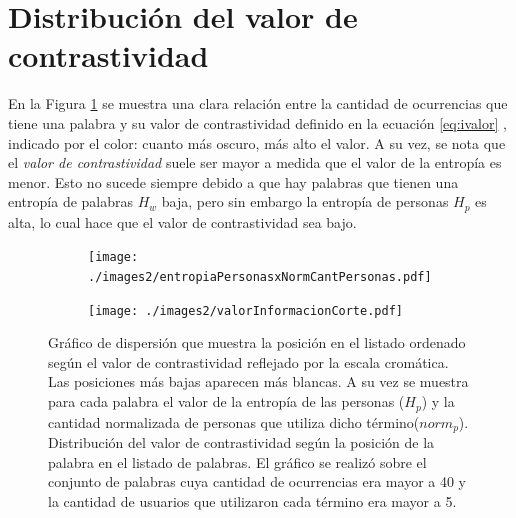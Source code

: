 \section{Distribución del valor de contrastividad}
\label{sec:ValorDeLaInformacion}
En la Figura \ref{fig:infoValue} se muestra una clara relación entre la cantidad de ocurrencias que tiene una palabra y su valor de contrastividad definido en la ecuación \ref{eq:ivalor} , indicado por el color: cuanto más oscuro, más alto el valor. A su vez, se nota que el \textit{valor de contrastividad} suele ser mayor a medida que el valor de la entropía es menor. Esto no sucede siempre debido a que hay palabras que tienen una entropía de palabras $H_w$ baja, pero sin embargo la entropía de personas $H_p$ es alta, lo cual hace que el valor de contrastividad sea bajo.



\begin{figure}[!ht]\centering
  \begin{subfigure}[t]{0.49\linewidth}
    \centering
\texttt{[image: ./images2/entropiaPersonasxNormCantPersonas.pdf]}
\caption{} 
\label{fig:infoValue} 
  
   \end{subfigure}
   \begin{subfigure}[t]{0.49\linewidth}
      \centering
\texttt{[image: ./images2/valorInformacionCorte.pdf]}
\caption{} 
\label{fig:ivalue}
  \end{subfigure}
   \caption{ Gráfico de dispersión que muestra la posición en el listado ordenado según el valor de contrastividad reflejado por la escala cromática. Las posiciones más bajas aparecen más blancas. A su vez se muestra para cada palabra el valor de la entropía de las personas ($H_p$) y la cantidad normalizada de personas que utiliza dicho término($norm_p$).  Distribución del valor de contrastividad según la posición de la palabra en el listado de palabras. El gráfico se realizó sobre el conjunto de palabras cuya cantidad de ocurrencias era mayor a 40 y la cantidad de usuarios que utilizaron cada término era mayor a 5.}
   \label{fig:infoeivalue}
\end{figure}


